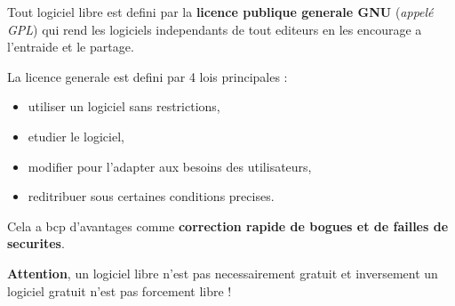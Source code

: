Tout logiciel libre est defini par la \textbf{licence publique generale GNU} (\textit{appelé GPL}) qui rend les logiciels independants de tout editeurs en les encourage a l'entraide et le partage.

La licence generale est defini par 4 lois principales :
\begin{itemize}
	\item utiliser un logiciel sans restrictions,
	\item etudier le logiciel,
	\item modifier pour l'adapter aux besoins des utilisateurs,
	\item reditribuer sous certaines conditions precises.
\end{itemize}
Cela a bcp d'avantages comme \textbf{correction rapide de bogues et de failles de securites}.

\textbf{Attention}, un logiciel libre n'est pas necessairement gratuit et inversement un logiciel gratuit n'est pas forcement libre ! \newpage
